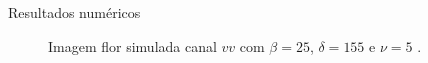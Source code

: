 \documentclass[10pt]{beamer}
\begin{document}
\begin{frame}{Resultados numéricos}
\begin{figure}[hbt]
	\caption{Imagem flor simulada canal $vv$ com $\beta = 25$, $\delta = 155$ e $\nu = 5$ .}
\label{cap_acf_fig15}
\endminipage\hfill
{}

\end{figure}
\end{frame}
\end{document}
